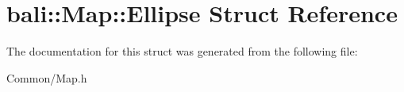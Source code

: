 \hypertarget{structbali_1_1_map_1_1_ellipse}{\section{bali\-:\-:Map\-:\-:Ellipse Struct Reference}
\label{structbali_1_1_map_1_1_ellipse}
}


The documentation for this struct was generated from the following file\-:\begin{DoxyCompactItemize}
\item 
Common/Map.\-h\end{DoxyCompactItemize}
